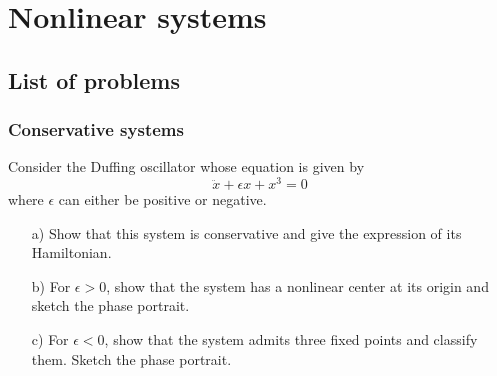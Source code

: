 \section{Nonlinear systems}\label{sec: nonlinear systems}

\subsection{List of problems}

\subsubsection*{Conservative systems}

\begin{problem}
  Consider the Duffing oscillator whose equation is given by
  \[
  \ddot{x} + \epsilon x + x^3 = 0
  \]
  where $\epsilon$ can either be positive or negative.

  \bigskip

  \begin{enumerate}
  \item[a)] Show that this system is conservative and give the expression of its Hamiltonian.

  \item[b)] For $\epsilon > 0$, show that the system has a nonlinear center at its origin and sketch the phase portrait.

  \item[c)] For $\epsilon < 0$, show that the system admits three fixed points and classify them.
    Sketch the phase portrait.
  \end{enumerate}
\end{problem}

\bigskip

